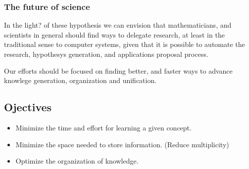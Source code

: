 \subsubsection{The future of science}
\indent
In the light? of these hypothesis we can envision that 
mathematicians, and scientists in general should find ways 
to delegate research, at least in the traditional sense to 
computer systems, given that it is possible to automate
the research, hypothesys generation, and applications proposal 
process.
 
 \indent
Our efforts should be focused on finding better, and faster 
ways to advance knowlege generation, organization and 
unification.




\subsection{Ojectives}
\begin{itemize}
 \item Minimize the time and effort for learning a 
given concept.
\item Minimize the space needed to store 
information. (Reduce multiplicity)
\item Optimize the organization of knowledge.
\end{itemize}